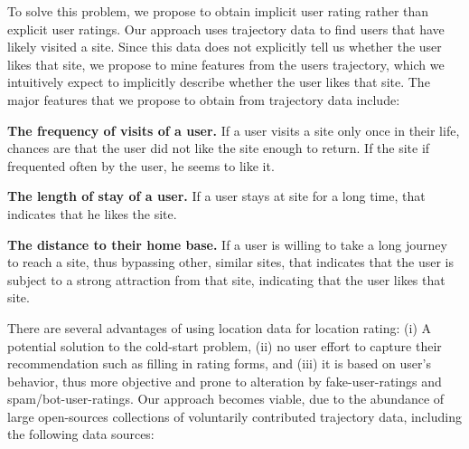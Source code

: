To solve this problem, we propose to obtain implicit user rating rather than explicit user ratings. Our approach uses trajectory data to find users that have likely visited a site. 
Since this data does not explicitly tell us whether the user likes that site, we propose to mine features from the users trajectory, which we intuitively expect to implicitly describe whether the user likes that site. The major features that we propose to obtain from trajectory data include:
\begin{compactitem}
\item {\bf The frequency of visits of a user.} If a user visits a site only once in their life, chances are that the user did not like the site enough to return. If the site if frequented often by the user, he seems to like it.
\item {\bf The length of stay of a user.} If a user stays at site for a long time, that indicates that he likes the site.
\item {\bf The distance to their home base.} If a user is willing to take a long journey to reach a site, thus bypassing other, similar sites, that indicates that the user is subject to a strong attraction from that site, indicating that the user likes that site.
\end{compactitem}
There are several advantages of using location data for location rating: (i) A potential solution to the cold-start problem, (ii) no user effort to capture their recommendation such as filling in rating forms, and (iii) it is based on user's behavior, thus more objective and prone to alteration by fake-user-ratings and spam/bot-user-ratings.
%
Our approach becomes viable, due to the abundance of large open-sources collections of voluntarily contributed trajectory data, including the following data sources:
